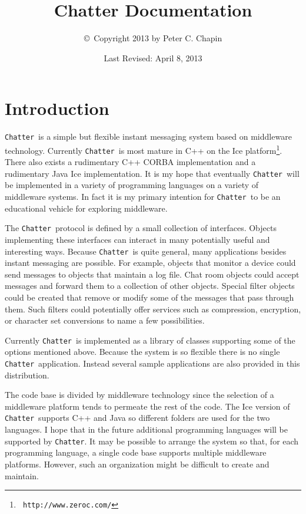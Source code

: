 \documentclass[twocolumn]{article}
\newcommand{\Chatter}{\texttt{Chatter}}
\begin{document}
\title{Chatter Documentation}
\author{\copyright\ Copyright 2013 by Peter C. Chapin}
\date{Last Revised: April 8, 2013}
\maketitle

\section*{Introduction}

\Chatter\ is a simple but flexible instant messaging system based on middleware technology.
Currently \Chatter\ is most mature in C++ on the Ice platform\footnote{\tt
  http://www.zeroc.com/}. There also exists a rudimentary C++ CORBA implementation and a
rudimentary Java Ice implementation. It is my hope that eventually \Chatter\ will be implemented
in a variety of programming languages on a variety of middleware systems. In fact it is my
primary intention for \Chatter\ to be an educational vehicle for exploring middleware.

The \Chatter\ protocol is defined by a small collection of interfaces. Objects implementing
these interfaces can interact in many potentially useful and interesting ways. Because \Chatter\
is quite general, many applications besides instant messaging are possible. For example, objects
that monitor a device could send messages to objects that maintain a log file. Chat room objects
could accept messages and forward them to a collection of other objects. Special filter objects
could be created that remove or modify some of the messages that pass through them. Such filters
could potentially offer services such as compression, encryption, or character set conversions
to name a few possibilities.

Currently \Chatter\ is implemented as a library of classes supporting some of the options
mentioned above. Because the system is so flexible there is no single \Chatter\ application.
Instead several sample applications are also provided in this distribution.

The code base is divided by middleware technology since the selection of a middleware platform
tends to permeate the rest of the code. The Ice version of \Chatter\ supports C++ and Java so
different folders are used for the two languages. I hope that in the future additional
programming languages will be supported by \Chatter. It may be possible to arrange the system so
that, for each programming language, a single code base supports multiple middleware platforms.
However, such an organization might be difficult to create and maintain.
\end{document}
